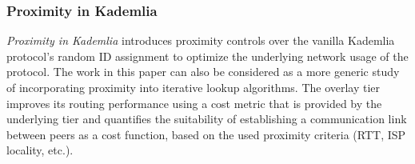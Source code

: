 

\subsubsection{Proximity in Kademlia}

\emph{Proximity in Kademlia} \cite{KLKP2008} introduces proximity
controls over the vanilla Kademlia protocol's random ID assignment to
optimize the underlying network usage of the protocol. The work in this paper
can also be considered as a more generic study of incorporating proximity into
iterative lookup algorithms. 
The overlay tier improves its routing
performance using a cost metric that is provided by the underlying tier
and quantifies the suitability of establishing a communication link between peers as
a cost function, based on the used proximity criteria (RTT, ISP locality, etc.).

